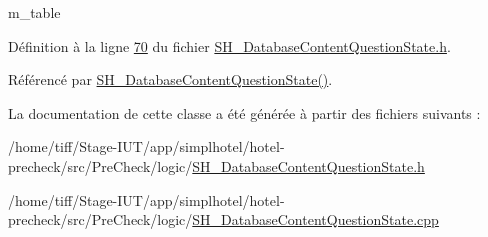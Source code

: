 m\-\_\-table 



Définition à la ligne \hyperlink{SH__DatabaseContentQuestionState_8h_source_l00070}{70} du fichier \hyperlink{SH__DatabaseContentQuestionState_8h_source}{S\-H\-\_\-\-Database\-Content\-Question\-State.\-h}.



Référencé par \hyperlink{classSimpleHotel_1_1SH__DatabaseContentQuestionState_a91df6c69a129ca799d29610b3332747d}{S\-H\-\_\-\-Database\-Content\-Question\-State()}.



La documentation de cette classe a été générée à partir des fichiers suivants \-:\begin{DoxyCompactItemize}
\item 
/home/tiff/\-Stage-\/\-I\-U\-T/app/simplhotel/hotel-\/precheck/src/\-Pre\-Check/logic/\hyperlink{SH__DatabaseContentQuestionState_8h}{S\-H\-\_\-\-Database\-Content\-Question\-State.\-h}\item 
/home/tiff/\-Stage-\/\-I\-U\-T/app/simplhotel/hotel-\/precheck/src/\-Pre\-Check/logic/\hyperlink{SH__DatabaseContentQuestionState_8cpp}{S\-H\-\_\-\-Database\-Content\-Question\-State.\-cpp}\end{DoxyCompactItemize}
